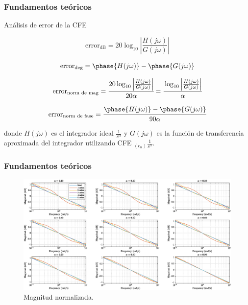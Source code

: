 \documentclass[10pt]{beamer}
\begin{document}
	\begin{frame}
		\frametitle{Fundamentos teóricos}
		\begin{block}{Análisis de error de la CFE}
		\begin{small}
		\begin{equation}
			\mathrm{error}_{\mathrm{dB}} = 20\log_{10} \left| \frac{H(j\omega)}{G(j\omega)} \right|
			\label{ec:error_sin_norm}
		\end{equation}
	
		\begin{equation}
			\mathrm{error}_{\mathrm{deg}} = \phase{H(j\omega)} - \phase{G(j\omega)}
		\end{equation}
		
		\begin{equation}
			\mathrm{error}_{\mathrm{norm\,\,de\,\,mag}} = \cfrac{ 20\log_{10} \left| \frac{H(j\omega)}{G(j\omega)} \right| }{20 \alpha} = \cfrac{ \log_{10} \left| \frac{H(j\omega)}{G(j\omega)} \right| }{ \alpha}
		\end{equation}
	
		\begin{equation}
			\mathrm{error}_{\mathrm{norm\,\,de\,\,fase}} = \cfrac{\phase{H(j\omega)} - \phase{G(j\omega)}}{90\alpha}
		\end{equation}
		\end{small}
		\justifying
		donde $H(j\omega)$ es el integrador ideal $\frac{1}{s^{\alpha}}$ y $G(j\omega)$ es la función de transferencia aproximada del integrador utilizando CFE $ _{(c_{n})} \frac{1}{s^{\alpha}}$. 
		\end{block}
	\end{frame}		
	\begin{frame}
		\frametitle{Fundamentos teóricos}
		\begin{figure}[hbtp]
			\caption{Magnitud normalizada.}
			\centering
			\includegraphics[trim={0cm 0cm 0cm 0.2cm},clip,width=1.3\textheight]{../imagenes/F6_bode_magnitud_norm_c.eps}
		\end{figure}
	\end{frame}	
\end{document}
